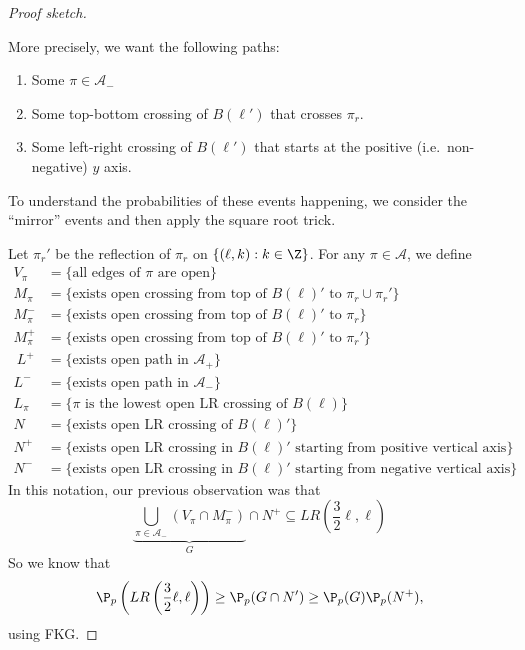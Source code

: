\documentclass[a4paper]{article}
\begin{document}
\begin{proof}[Proof sketch]
\begin{center}
  \end{center}
  More precisely, we want the following paths:
  \begin{enumerate}
    \item Some $\pi \in \mathcal{A}_-$
    \item Some top-bottom crossing of $B(\ell')$ that crosses $\pi_r$.
    \item Some left-right crossing of $B(\ell')$ that starts at the positive (i.e.\ non-negative) $y$ axis.
  \end{enumerate}
  To understand the probabilities of these events happening, we consider the ``mirror'' events and then apply the square root trick.

  Let $\pi_r'$ be the reflection of $\pi_r$ on $\{(\ell, k): k \in \Z\}$. For any $\pi \in \mathcal{A}$, we define
  \begin{align*}
    V_\pi &= \{\text{all edges of $\pi$ are open}\}\\
    M_\pi &= \{\text{exists open crossing from top of $B(\ell)'$ to $\pi_r \cup \pi_r'$}\}\\
    M_\pi^- &= \{\text{exists open crossing from top of $B(\ell)'$ to $\pi_r$}\}\\
    M_\pi^+ &= \{\text{exists open crossing from top of $B(\ell)'$ to $\pi_r'$}\}\\\
    L^+ &= \{\text{exists open path in $\mathcal{A}_+$}\}\\
    L^- &= \{\text{exists open path in $\mathcal{A}_-$}\}\\
    L_\pi &= \{\text{$\pi$ is the lowest open LR crossing of $B(\ell)$}\}\\
    N &= \{\text{exists open LR crossing of $B(\ell)'$}\}\\
    N^+ &= \{\text{exists open LR crossing in $B(\ell)'$ starting from positive vertical axis}\}\\
    N^- &= \{\text{exists open LR crossing in $B(\ell)'$ starting from negative vertical axis}\}
  \end{align*}
  In this notation, our previous observation was that
  \[
    \underbrace{\bigcup_{\pi \in \mathcal{A}_-}(V_\pi \cap M_{\pi}^-)}_{G} \cap N^+ \subseteq LR\left(\frac{3}{2} \ell, \ell\right)
  \]
  So we know that
  \[
    \P_p\left(LR\left(\frac{3}{2}\ell, \ell\right)\right) \geq \P_p(G \cap N') \geq \P_p(G) \P_p(N^+),
  \]
  using FKG.


\end{proof}
\end{document}

